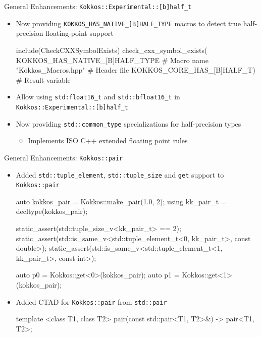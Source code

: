 \begin{frame}[fragile]{General Enhancements: \texttt{Kokkos::Experimental::[b]half\_t}}
  \begin{itemize}
    \item Now providing \texttt{KOKKOS\_HAS\_NATIVE\_[B]HALF\_TYPE} macros to detect true half-precision floating-point support
      \begin{code}[keywords={include,check_cxx_symbol_exists}]
include(CheckCXXSymbolExists)
check_cxx_symbol_exists(
  KOKKOS_HAS_NATIVE_[B]HALF_TYPE # Macro name
  "Kokkos_Macros.hpp"            # Header file
  KOKKOS_CORE_HAS_[B]HALF_T)     # Result variable
      \end{code}
    \vfill
    \item Allow using \texttt{std:float16\_t} and \texttt{std::bfloat16\_t} in \texttt{Kokkos::Experimental::[b]half\_t}
    \vfill
    \item Now providing \texttt{std::common\_type} specializations for half-precision types
    \begin{itemize}
      \item[] Implements ISO C++ extended floating point rules
    \end{itemize}
  \end{itemize}
\end{frame}

\begin{frame}[fragile]{General Enhancements: \texttt{Kokkos::pair}}
  \begin{itemize}
    \item Added \texttt{std::tuple\_element}, \texttt{std::tuple\_size} and \texttt{get} support to \texttt{Kokkos::pair}
    \begin{code}[keywords={make_pair,get,tuple_size_v,tuple_element_t,static_assert,decltype,auto,using}]
auto kokkos_pair = Kokkos::make_pair(1.0, 2);
using kk_pair_t = decltype(kokkos_pair);

static_assert(std::tuple_size_v<kk_pair_t> == 2);
static_assert(std::is_same_v<std::tuple_element_t<0, kk_pair_t>, 
                             const double>);
static_assert(std::is_same_v<std::tuple_element_t<1, kk_pair_t>,
                             const int>);

auto p0 = Kokkos::get<0>(kokkos_pair);
auto p1 = Kokkos::get<1>(kokkos_pair);
    \end{code}
    \vfill
    \item Added CTAD for \texttt{Kokkos::pair} from \texttt{std::pair}
    \begin{code}[keywords={template,pair}]
template <class T1, class T2>
pair(const std::pair<T1, T2>&) -> pair<T1, T2>;
    \end{code}
  \end{itemize}
\end{frame}

